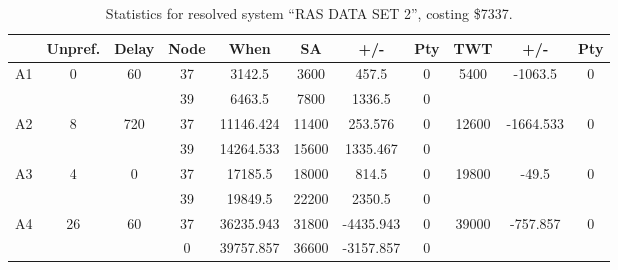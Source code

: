 \begin{sidewaystable}
\footnotesize
\caption{Statistics for resolved system ``RAS DATA SET 2'', costing \$7337.}
\centering
\begin{tabular}{c||c|c||c|c|c|c|c||c|c|c}
  \hline \hline
  &
  Unpref. & 
  Delay &
  Node &
  When &
  SA &
  +/- &
  Pty &
  TWT &
  +/- &
  Pty \\
      \hline
      \multirow{2}{*}{A1} &
      \multirow{2}{*}{0} &
      \multirow{2}{*}{60} &
      37 &
      3142.5 &
      3600 &
        457.5 &
        0 &
      \multirow{2}{*}{5400} &
        \multirow{2}{*}{-1063.5} &
        \multirow{2}{*}{0}
      \\
      \cline{4-8}
       &
       &
       &
      39 &
      6463.5 &
      7800 &
        1336.5 &
        0 &
      
         &
        
      \\
      \hline
      \multirow{2}{*}{A2} &
      \multirow{2}{*}{8} &
      \multirow{2}{*}{720} &
      37 &
      11146.424 &
      11400 &
        253.576 &
        0 &
      \multirow{2}{*}{12600} &
        \multirow{2}{*}{-1664.533} &
        \multirow{2}{*}{0}
      \\
      \cline{4-8}
       &
       &
       &
      39 &
      14264.533 &
      15600 &
        1335.467 &
        0 &
      
         &
        
      \\
      \hline
      \multirow{2}{*}{A3} &
      \multirow{2}{*}{4} &
      \multirow{2}{*}{0} &
      37 &
      17185.5 &
      18000 &
        814.5 &
        0 &
      \multirow{2}{*}{19800} &
        \multirow{2}{*}{-49.5} &
        \multirow{2}{*}{0}
      \\
      \cline{4-8}
       &
       &
       &
      39 &
      19849.5 &
      22200 &
        2350.5 &
        0 &
      
         &
        
      \\
      \hline
      \multirow{2}{*}{A4} &
      \multirow{2}{*}{26} &
      \multirow{2}{*}{60} &
      37 &
      36235.943 &
      31800 &
        -4435.943 &
        0 &
      \multirow{2}{*}{39000} &
        \multirow{2}{*}{-757.857} &
        \multirow{2}{*}{0}
      \\
      \cline{4-8}
       &
       &
       &
      0 &
      39757.857 &
      36600 &
        -3157.857 &
        0 &
      

\end{tabular}
\end{sidewaystable}
